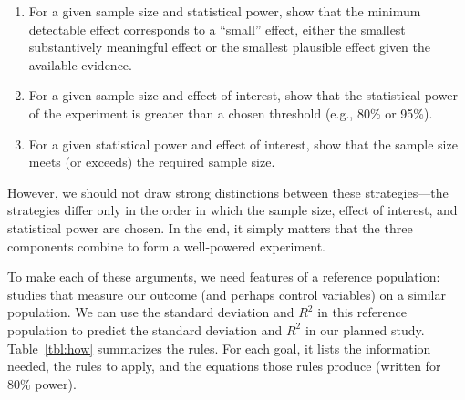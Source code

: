 \documentclass[12pt]{article}
\begin{document}
\begin{enumerate}
\item For a given sample size and statistical power, show that the minimum detectable effect corresponds to a ``small'' effect, either the smallest substantively meaningful effect or the smallest plausible effect given the available evidence.
\item For a given sample size and effect of interest, show that the statistical power of the experiment is greater than a chosen threshold (e.g., 80\% or 95\%).
\item For a given statistical power and effect of interest, show that the sample size meets (or exceeds) the required sample size.
\end{enumerate}

\noindent However, we should not draw strong distinctions between these strategies---the strategies differ only in the order in which the sample size, effect of interest, and statistical power are chosen.
In the end, it simply matters that the three components combine to form a well-powered experiment.

To make each of these arguments, we need features of a reference population: studies that measure our outcome (and perhaps control variables) on a similar population.
We can use the standard deviation and $R^2$ in this reference population to predict the standard deviation and $R^2$ in our planned study.
Table~\ref{tbl:how} summarizes the rules.
For each goal, it lists the information needed, the rules to apply, and the equations those rules produce (written for 80\% power).
\end{document}
